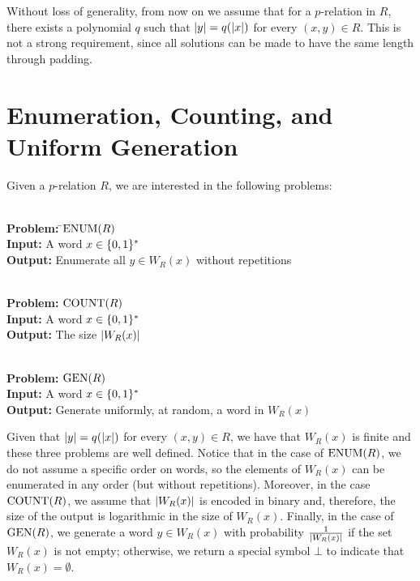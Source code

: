\documentclass[11pt,twoside=off,numbers=noenddot]{scrbook}
\begin{document}
Without loss of generality, from now on we assume that for a $p$-relation in $R$, there exists a polynomial $q$ such that $| y | = q(| x |)$ for every $(x, y) \in R$. This is not a strong requirement, since all solutions can be made to have the same length through padding.

\section{Enumeration, Counting, and Uniform Generation}
Given a $p$-relation $R$, we are interested in the following problems:

\begin{definition}[$\ENUM$]
    \begin{tabbing}
        \\[3pt]
        \textbf{Problem:} \= \quad $\text{ENUM}(R)$ \\
        \textbf{Input:} \> \quad A word $x \in \{ 0, 1 \}^\ast$ \\
        \textbf{Output:} \> \quad Enumerate all $y \in W_R(x)$ without repetitions
    \end{tabbing}
\end{definition}

\begin{definition}[$\COUNT$]
    \begin{tabbing}
        \\[3pt]
        \textbf{Problem:} $\text{COUNT}(R)$ \\
        \textbf{Input:} A word $x \in \{ 0, 1 \}^\ast$ \\
        \textbf{Output:} The size $| W_R(x) |$
    \end{tabbing}
\end{definition}

\begin{definition}[$\GEN$]
    \begin{tabbing}
        \\[3pt]
        \textbf{Problem:} $\text{GEN}(R)$ \\
        \textbf{Input:} A word $x \in \{ 0, 1 \}^\ast$ \\
        \textbf{Output:} Generate uniformly, at random, a word in $W_R(x)$
    \end{tabbing}
\end{definition}

Given that $| y | = q(| x |)$ for every $(x, y) \in R$, we have that $W_R(x)$ is finite and these three problems are well defined. Notice that in the case of $\text{ENUM}(R)$, we do not assume a specific order on words, so the elements of $W_R(x)$ can be enumerated in any order (but without repetitions). Moreover, in the case $\text{COUNT}(R)$, we assume that $| W_R(x) |$ is encoded in binary and, therefore, the size of the output is logarithmic in the size of $W_R(x)$. Finally, in the case of $\text{GEN}(R)$, we generate a word $y \in W_R(x)$ with probability $\frac{1}{| W_R(x) |}$ if the set $W_R(x)$ is not empty; otherwise, we return a special symbol $\bot$ to indicate that $W_R(x) = \emptyset$.
\end{document}

